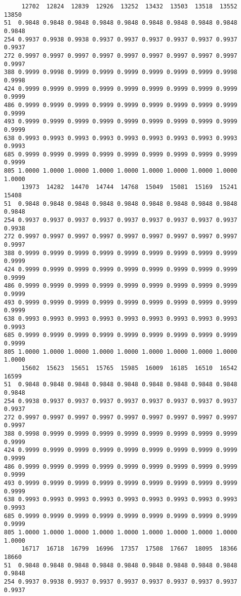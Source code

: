 \documentclass[
]{report}
\begin{document}
\begin{verbatim}
     12702  12824  12839  12926  13252  13432  13503  13518  13552  13850
51  0.9848 0.9848 0.9848 0.9848 0.9848 0.9848 0.9848 0.9848 0.9848 0.9848
254 0.9937 0.9938 0.9938 0.9937 0.9937 0.9937 0.9937 0.9937 0.9937 0.9937
272 0.9997 0.9997 0.9997 0.9997 0.9997 0.9997 0.9997 0.9997 0.9997 0.9997
388 0.9999 0.9998 0.9999 0.9999 0.9999 0.9999 0.9999 0.9999 0.9998 0.9998
424 0.9999 0.9999 0.9999 0.9999 0.9999 0.9999 0.9999 0.9999 0.9999 0.9999
486 0.9999 0.9999 0.9999 0.9999 0.9999 0.9999 0.9999 0.9999 0.9999 0.9999
493 0.9999 0.9999 0.9999 0.9999 0.9999 0.9999 0.9999 0.9999 0.9999 0.9999
638 0.9993 0.9993 0.9993 0.9993 0.9993 0.9993 0.9993 0.9993 0.9993 0.9993
685 0.9999 0.9999 0.9999 0.9999 0.9999 0.9999 0.9999 0.9999 0.9999 0.9999
805 1.0000 1.0000 1.0000 1.0000 1.0000 1.0000 1.0000 1.0000 1.0000 1.0000
     13973  14282  14470  14744  14768  15049  15081  15169  15241  15408
51  0.9848 0.9848 0.9848 0.9848 0.9848 0.9848 0.9848 0.9848 0.9848 0.9848
254 0.9937 0.9937 0.9937 0.9937 0.9937 0.9937 0.9937 0.9937 0.9937 0.9938
272 0.9997 0.9997 0.9997 0.9997 0.9997 0.9997 0.9997 0.9997 0.9997 0.9997
388 0.9999 0.9999 0.9999 0.9999 0.9999 0.9999 0.9999 0.9999 0.9999 0.9999
424 0.9999 0.9999 0.9999 0.9999 0.9999 0.9999 0.9999 0.9999 0.9999 0.9999
486 0.9999 0.9999 0.9999 0.9999 0.9999 0.9999 0.9999 0.9999 0.9999 0.9999
493 0.9999 0.9999 0.9999 0.9999 0.9999 0.9999 0.9999 0.9999 0.9999 0.9999
638 0.9993 0.9993 0.9993 0.9993 0.9993 0.9993 0.9993 0.9993 0.9993 0.9993
685 0.9999 0.9999 0.9999 0.9999 0.9999 0.9999 0.9999 0.9999 0.9999 0.9999
805 1.0000 1.0000 1.0000 1.0000 1.0000 1.0000 1.0000 1.0000 1.0000 1.0000
     15602  15623  15651  15765  15985  16009  16185  16510  16542  16599
51  0.9848 0.9848 0.9848 0.9848 0.9848 0.9848 0.9848 0.9848 0.9848 0.9848
254 0.9938 0.9937 0.9937 0.9937 0.9937 0.9937 0.9937 0.9937 0.9937 0.9937
272 0.9997 0.9997 0.9997 0.9997 0.9997 0.9997 0.9997 0.9997 0.9997 0.9997
388 0.9998 0.9999 0.9999 0.9999 0.9999 0.9999 0.9999 0.9999 0.9999 0.9999
424 0.9999 0.9999 0.9999 0.9999 0.9999 0.9999 0.9999 0.9999 0.9999 0.9999
486 0.9999 0.9999 0.9999 0.9999 0.9999 0.9999 0.9999 0.9999 0.9999 0.9999
493 0.9999 0.9999 0.9999 0.9999 0.9999 0.9999 0.9999 0.9999 0.9999 0.9999
638 0.9993 0.9993 0.9993 0.9993 0.9993 0.9993 0.9993 0.9993 0.9993 0.9993
685 0.9999 0.9999 0.9999 0.9999 0.9999 0.9999 0.9999 0.9999 0.9999 0.9999
805 1.0000 1.0000 1.0000 1.0000 1.0000 1.0000 1.0000 1.0000 1.0000 1.0000
     16717  16718  16799  16996  17357  17508  17667  18095  18366  18660
51  0.9848 0.9848 0.9848 0.9848 0.9848 0.9848 0.9848 0.9848 0.9848 0.9848
254 0.9937 0.9938 0.9937 0.9937 0.9937 0.9937 0.9937 0.9937 0.9937 0.9937

\end{verbatim}
\end{document}
